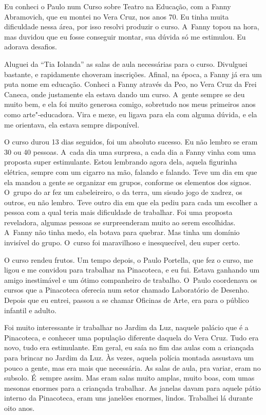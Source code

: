 Eu conheci o Paulo num Curso sobre Teatro na Educação, com a Fanny
Abramovich, que eu montei no Vera Cruz, nos anos 70. Eu tinha muita
dificuldade nessa área, por isso resolvi produzir o curso. A~Fanny topou
na hora, mas duvidou que eu fosse conseguir montar, sua dúvida só me
estimulou. Eu adorava desafios.

Aluguei da ``Tia Iolanda'' as salas de aula necessárias para o curso.
Divulguei bastante, e rapidamente choveram inscrições. Afinal, na época,
a Fanny já era um puta nome em educação. Conheci a Fanny através da Peo,
no Vera Cruz da Frei Caneca, onde justamente ela estava dando um curso.
A~gente sempre se deu muito bem, e ela foi muito generosa comigo,
sobretudo nos meus primeiros anos como arte"-educadora. Vira e mexe, eu
ligava para ela com alguma dúvida, e ela me orientava, ela estava sempre
disponível.

O curso durou 13 dias seguidos, foi um absoluto sucesso. Eu não lembro
se eram 30 ou 40 pessoas. A~cada dia uma surpresa, a cada dia a Fanny
vinha com uma proposta super estimulante. Estou lembrando agora dela,
aquela figurinha elétrica, sempre com um cigarro na mão, falando e
falando. Teve um dia em que ela mandou a gente se organizar em grupos,
conforme os elementos dos signos. O~grupo do ar fez um cabeleireiro, o
da terra, um sisudo jogo de xadrez, os outros, eu não lembro. Teve outro
dia em que ela pediu para cada um escolher a pessoa com a qual teria
mais dificuldade de trabalhar. Foi uma proposta reveladora, algumas
pessoas se surpreenderam muito ao serem escolhidas. A~Fanny não tinha
medo, ela botava para quebrar. Mas tinha um domínio invisível do grupo.
O~curso foi maravilhoso e inesquecível, deu super certo.

O curso rendeu frutos. Um tempo depois, o Paulo Portella, que fez o
curso, me ligou e me convidou para trabalhar na Pinacoteca, e eu fui.
Estava ganhando um amigo inestimável e um ótimo companheiro de trabalho.
O~Paulo coordenava os cursos que a Pinacoteca oferecia num setor chamado
Laboratório de Desenho. Depois que eu entrei, passou a se chamar
Oficinas de Arte, era para o público infantil e adulto.

Foi muito interessante ir trabalhar no Jardim da Luz, naquele palácio
que é a Pinacoteca, e conhecer uma população diferente daquela do Vera
Cruz. Tudo era novo, tudo era estimulante. Em geral, eu saía no fim das
aulas com a criançada para brincar no Jardim da Luz. Às vezes, aquela
polícia montada assustava um pouco a gente, mas era mais que necessária.
As salas de aula, pra variar, eram no subsolo. É~sempre assim. Mas eram
salas muito amplas, muito boas, com umas mesonas enormes para a
criançada trabalhar. As janelas davam para aquele pátio interno da
Pinacoteca, eram uns janelões enormes, lindos. Trabalhei lá durante oito
anos.

